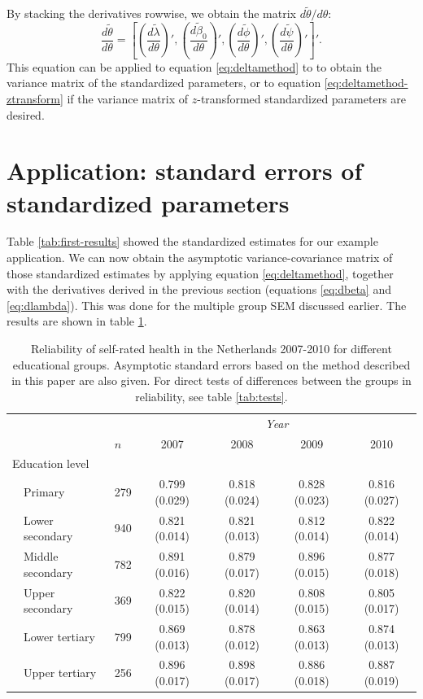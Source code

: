 \documentclass[a4paper, 11pt]{article}
\renewcommand{\l}{\lambda}
\renewcommand{\b}{\beta}
\newcommand{\thetastan}{\tilde{\theta}}
\newcommand{\0}{\boldsymbol{0}}
\begin{document}
By stacking the derivatives rowwise, we obtain the matrix $d \thetastan / d \theta$:
\begin{equation}\label{eq:dthetatilde}
\frac{d \thetastan}{d \theta} = [
\left( \frac{d \tilde\l}{d \theta} \right)',
\left( \frac{d \tilde\b_0}{d \theta} \right)',
\left( \frac{d \tilde{\phi}}{d \theta} \right)',
\left( \frac{d \tilde{\psi}}{d \theta}\right)'
]'.
\end{equation}
This equation can be applied to equation \ref{eq:deltamethod} to 
to obtain the variance matrix of the standardized parameters, or to equation \ref{eq:deltamethod-ztransform}
if the variance matrix of $z$-transformed standardized parameters are desired.


\section{Application: standard errors of standardized parameters}

Table  \ref{tab:first-results} showed the standardized estimates for our example application. We can now obtain the 
 asymptotic variance-covariance matrix of those standardized estimates 
by applying equation \ref{eq:deltamethod}, together with the derivatives derived in the previous section (equations \ref{eq:dbeta} and \ref{eq:dlambda}). This was done for the multiple group SEM discussed earlier. The results are shown in table \ref{tab:health-education}.

\begin{table}[tbh]
\begin{center}
\begin{tabular}{lllcccc}  \hline  \hline
&&&  \multicolumn{4}{c}{\emph{Year}}\\\cline{4-7}
&&$n$& 2007&2008&2009&2010\\
  \hline
  \multicolumn{2}{l}{Education level}\\
& Primary	   & 279  & 0.799 (0.029) & 0.818 (0.024) & 0.828 (0.023) & 0.816 (0.027) \\ 
& Lower secondary  & 940  & 0.821 (0.014) & 0.821 (0.013) & 0.812 (0.014) & 0.822 (0.014) \\ 
& Middle secondary & 782  & 0.891 (0.016) & 0.879 (0.017) & 0.896 (0.015) & 0.877 (0.018) \\ 
& Upper secondary  & 369  & 0.822 (0.015) & 0.820 (0.014) & 0.808 (0.015) & 0.805 (0.017) \\ 
& Lower tertiary   & 799  & 0.869 (0.013) & 0.878 (0.012) & 0.863 (0.013) & 0.874 (0.013) \\ 
& Upper tertiary   & 256  & 0.896 (0.017) & 0.898 (0.017) & 0.886 (0.018) & 0.887 (0.019) \\ 
  \hline     \hline
\end{tabular}
\caption{Reliability of self-rated health in the Netherlands 2007-2010 for different educational groups. 
Asymptotic standard errors based on the method described in this paper are also given. For direct tests of 
differences between the groups in reliability, see table \ref{tab:tests}.}\label{tab:health-education}
\end{center}
\end{table}
\end{document}
